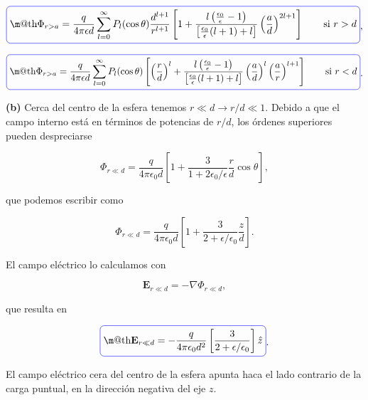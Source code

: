 \documentclass[a4paper,11pt]{article}
\makeatletter
\numberwithin{equation}{section}
\newcommand*{\boxcolor}{blue}
\renewcommand{\boxed}[1]{\textcolor{\boxcolor}{%
\tikz[baseline={([yshift=-1ex]current bounding box.center)}] \node [rectangle, minimum width=1ex,rounded corners,draw] {\normalcolor\m@th$\displaystyle#1$};}}
\makeatother
\begin{document}
\begin{equation}
 \boxed{\Phi_{r > a} =  \frac{q}{4\pi\epsilon d}\sum_{l=0}^\infty P_l(\cos{\theta})
 \frac{d^{l+1}}{r^{l+1}}\left[1 +  \frac{l\left(\frac{\epsilon_0}{\epsilon} - 1\right)}{\left[\frac{\epsilon_0}{\epsilon}(l+1) + l\right]}
 \left(\frac{a}{d}\right)^{2l+1}\right] \qquad \text{si } r > d},
\end{equation}

\begin{equation}
 \boxed{\Phi_{r > a} =  \frac{q}{4\pi\epsilon d}\sum_{l=0}^\infty P_l(\cos{\theta})
 \left[\left(\frac{r}{d}\right)^l +  \frac{l\left(\frac{\epsilon_0}{\epsilon} - 1\right)}{\left[\frac{\epsilon_0}{\epsilon}(l+1) + l\right]}
 \left(\frac{a}{d}\right)^{l}\left(\frac{a}{r}\right)^{l+1}\right] \qquad \text{si } r < d}.
\end{equation}

\textbf{(b)} Cerca del centro de la esfera tenemos $r \ll d \rightarrow r/d \ll 1$. 
Debido a que el campo interno está en términos de potencias de $r/d$, los órdenes 
superiores pueden despreciarse 

\begin{equation}
 \Phi_{r \ll d} = \frac{q}{4\pi\epsilon_0 d}\left[1 + \frac{3}{1+2\epsilon_0/\epsilon}
 \frac{r}{d}\cos{\theta}\right],
\end{equation}

que podemos escribir como 

\begin{equation}
 \Phi_{r \ll d} = \frac{q}{4\pi\epsilon_0 d}\left[1 + \frac{3}{2 + \epsilon/\epsilon_0}
 \frac{z}{d}\right].
\end{equation}

El campo eléctrico lo calculamos con 

\begin{equation}
 \mathbf{E}_{r \ll d} = -\nabla \Phi_{r \ll d},
\end{equation}

que resulta en 

\begin{equation}
 \boxed{\mathbf{E}_{r \ll d} = - \frac{q}{4\pi\epsilon_0 d^2}\left[\frac{3}{2 + 
 \epsilon/\epsilon_0}\right] \hat{z}}.
\end{equation}

El campo eléctrico cera del centro de la esfera apunta haca el lado contrario 
de la carga puntual, en la dirección negativa del eje $z$.

\vspace{.3cm}
\end{document}
